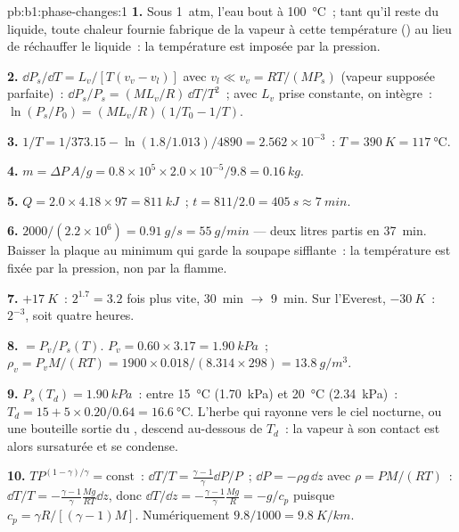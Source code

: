 \begin{solution}{pb:b1:phase-changes:1}
\textbf{1.} Sous \qty{1}{atm}, l'eau bout à \qty{100}{\degreeCelsius}~; tant
qu'il reste du liquide, toute chaleur fournie fabrique de la vapeur à cette
température () au lieu de réchauffer le liquide~: la température
est imposée par la pression.

\textbf{2.} $\dd P_s/\dd T = L_v/[T(v_v - v_l)]$ avec $v_l \ll v_v = RT/(MP_s)$
(vapeur supposée parfaite)~: $\dd P_s/P_s = (ML_v/R)\,\dd T/T^2$~; avec $L_v$
prise constante, on intègre~: $\ln(P_s/P_0) = (ML_v/R)(1/T_0 - 1/T)$.

\textbf{3.} $1/T = 1/373.15 - \ln(1.8/1.013)/4890 = 2.562 \times 10^{-3}$~: $T =
\qty{390}{K} = \qty{117}{\degreeCelsius}$.

\textbf{4.} $m = \Delta P\,A/g = 0.8 \times 10^5 \times 2.0 \times 10^{-5}/9.8 =
\qty{0.16}{kg}$.

\textbf{5.} $Q = 2.0 \times 4.18 \times 97 = \qty{811}{kJ}$~; $t = 811/2.0 =
\qty{405}{s} \approx \qty{7}{min}$.

\textbf{6.} $2000/(2.2 \times 10^6) = \qty{0.91}{g/s} = \qty{55}{g/min}$ --- deux
litres partis en \qty{37}{min}. Baisser la plaque au minimum qui garde la
soupape sifflante~: la température est fixée par la pression, non par la flamme.

\textbf{7.} $+\qty{17}{K}$~: $2^{1.7} = 3.2$ fois plus vite, \qty{30}{min}
$\to$ \qty{9}{min}. Sur l'Everest, $-\qty{30}{K}$~: $2^{-3}$, soit quatre heures.

\textbf{8.}  $= P_v/P_s(T)$. $P_v = 0.60 \times 3.17 =
\qty{1.90}{kPa}$~; $\rho_v = P_vM/(RT) = 1900 \times 0.018/(8.314 \times 298) =
\qty{13.8}{g/m^3}$.

\textbf{9.} $P_s(T_d) = \qty{1.90}{kPa}$~: entre \qty{15}{\degreeCelsius}
(\qty{1.70}{kPa}) et \qty{20}{\degreeCelsius} (\qty{2.34}{kPa})~: $T_d = 15 + 5 \times 0.20/0.64
= \qty{16.6}{\degreeCelsius}$. L'herbe qui rayonne vers le ciel nocturne, ou une
bouteille sortie du , descend au-dessous de $T_d$~: la vapeur à son
contact est alors sursaturée et se condense.

\textbf{10.} $TP^{(1-\gamma)/\gamma} = \text{const}$~: $\dd T/T = \frac{\gamma - 1}{\gamma}
\dd P/P$~; $\dd P = -\rho g\,\dd z$ avec $\rho = PM/(RT)$~: $\dd T/T = -\frac{\gamma -
1}{\gamma}\frac{Mg}{RT}\dd z$, donc $\dd T/\dd z = -\frac{\gamma - 1}{\gamma}\frac{Mg}{R} =
-g/c_p$ puisque $c_p = \gamma R/[(\gamma - 1)M]$. Numériquement $9.8/1000 = \qty{9.8}{K/km}$.


\end{solution}
